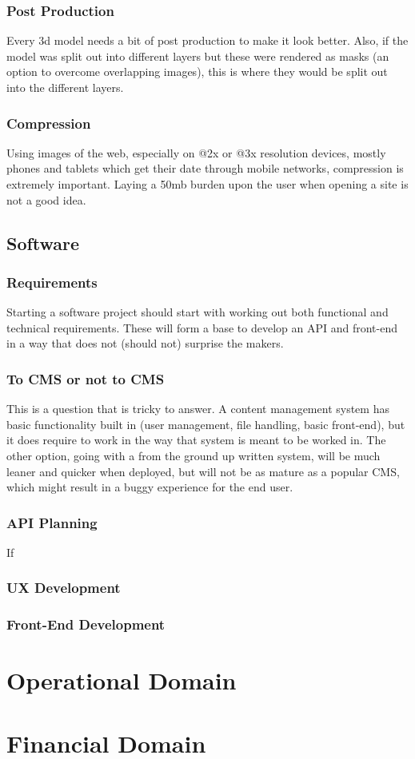 \subsubsection{Post Production}
Every 3d model needs a bit of post production to make it look better. Also, if the model was split out into different layers but these were rendered as masks (an option to overcome overlapping images), this is where they would be split out into the different layers.
\subsubsection{Compression}
Using images of the web, especially on @2x or @3x resolution devices, mostly phones and tablets which get their date through mobile networks, compression is extremely important. Laying a 50mb burden upon the user when opening a site is not a good idea.

\subsection{Software}
\subsubsection{Requirements}
Starting a software project should start with working out both functional and technical requirements. These will form a base to develop an API and front-end in a way that does not (should not) surprise the makers.
\subsubsection{To CMS or not to CMS}
This is a question that is tricky to answer. A content management system has basic functionality built in (user management, file handling, basic front-end), but it does require to work in the way that system is meant to be worked in. The other option, going with a from the ground up written system, will be much leaner and quicker when deployed, but will not be as mature as a popular CMS, which might result in a buggy experience for the end user.
\subsubsection{API Planning}
If 
\subsubsection{UX Development}
\subsubsection{Front-End Development}

\section{Operational Domain}

\section{Financial Domain}

\newpage
